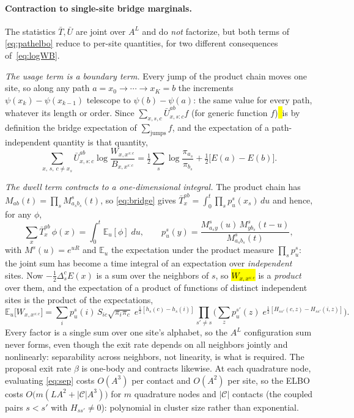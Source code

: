 \documentclass[11pt]{article}
\newcommand{\revised}[1]{\hl{#1}}   %
\newcommand{\E}{\mathbb{E}}
\begin{document}
\paragraph{Contraction to single-site bridge marginals.} The statistics $\bar T,\bar U$ are
joint over $A^L$ and do \emph{not} factorize, but both terms of \eqref{eq:pathelbo}
reduce to per-site quantities, for two different consequences of~\eqref{eq:logWB}.

\emph{The usage term is a boundary term.} Every jump of the product chain moves one site,
so along any path $a=x_0\to\cdots\to x_K=b$ the increments $\psi(x_k)-\psi(x_{k-1})$
telescope to $\psi(b)-\psi(a)$: the same value for every path, whatever its length or
order. Since $\sum_{x,s,c}\bar U^{ab}_{x,s:c}f$ (for generic function $f$)\revised{~}is by definition the bridge
expectation of $\sum_{\mathrm{jumps}}f$, and the expectation of a path-independent
quantity is that quantity,
\begin{equation}\label{eq:telescope}
 \sum_{x,\,s,\,c\ne x_s}\bar U^{ab}_{x,s:c}\log\frac{W_{x,x^{s:c}}}{B_{x,x^{s:c}}}
 =\tfrac12\sum_s\log\frac{\pi_{a_s}}{\pi_{b_s}}+\tfrac12\big[E(a)-E(b)\big].
\end{equation}

\emph{The dwell term contracts to a one-dimensional integral.} The product chain has
$M_{ab}(t)=\prod_sM^s_{a_sb_s}(t)$, so \eqref{eq:bridge} gives
$\bar T^{ab}_x=\int_0^t\prod_sp^s_u(x_s)\,du$ and hence, for any $\phi$,
\begin{equation}\label{eq:contract}
 \sum_x\bar T^{ab}_x\,\phi(x)=\int_0^t\!\E_u[\phi]\;du,
 \qquad
 p^s_u(y)=\frac{M^s_{a_sy}(u)\,M^s_{yb_s}(t-u)}{M^s_{a_sb_s}(t)},
\end{equation}
with $M^s(u)=e^{uR}$ and $\E_u$ the expectation under the product measure
$\prod_sp^s_u$: the joint sum has become a time integral of an expectation over
\emph{independent} sites. Now $-\tfrac12\Delta^c_sE(x)$ is a sum over the neighbors of
$s$, so \revised{$W_{x,x^{s:c}}$} is a \emph{product} over them, and the expectation of a product of functions
of distinct independent sites is the product of the expectations,
\begin{equation}\label{eq:sep}
 \E_u\big[W_{x,x^{s:c}}\big]=\sum_i p^s_u(i)\,S_{ic}\sqrt{\pi_i\pi_c}\;
   e^{\frac12[h_s(c)-h_s(i)]}
   \prod_{s'\ne s}\Big(\sum_z p^{s'}_u(z)\;e^{\frac12[H_{ss'}(c,z)-H_{ss'}(i,z)]}\Big).
\end{equation}
Every factor is a single sum over one site's alphabet, so the $A^L$ configuration sum
never forms, even though the exit rate depends on all neighbors jointly and nonlinearly:
separability across neighbors, not linearity, is what is required. The proposal exit rate
$\beta$ is one-body and contracts likewise.
At each quadrature node, evaluating \eqref{eq:sep} costs $O(A^3)$ per contact and $O(A^2)$
per site, so the ELBO costs $O\!\big(m(LA^2+|\mathcal C|A^3)\big)$ for $m$ quadrature nodes
and $|\mathcal C|$ contacts (the coupled pairs $s<s'$ with $H_{ss'}\ne0$): polynomial in
cluster size rather than exponential.
\end{document}
